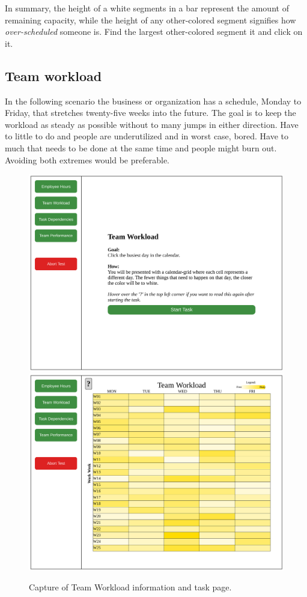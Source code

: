 \documentclass[nofilelist,dvipsnames]{cslthse-msc}
\begin{document}
{        In summary, the height of a white segments in a bar represent the
        amount of remaining capacity, while the height of any other-colored
        segment signifies how \textit{over-scheduled} someone is. Find the
        largest other-colored segment it and click on it.

      \subsection{Team workload}

        \textit{\ideaTwo}

        In the following scenario the business or organization has a schedule,
        Monday to Friday, that stretches twenty-five weeks into the future. The
        goal is to keep the workload as steady as possible without to many
        jumps in either direction. Have to little to do and people are
        underutilized and in worst case, bored. Have to much that needs to be
        done at the same time and people might burn out. Avoiding both
        extremes would be preferable.

        \begin{figure}[h!]
          \centering
          \includegraphics[width=.49\textwidth]{figures/captures/webapp_team_workload_info.pdf}
          \includegraphics[width=.49\textwidth]{figures/captures/webapp_team_workload_task.pdf}
          \caption{Capture of Team Workload information and task page.}
        \end{figure}

}
\end{document}
